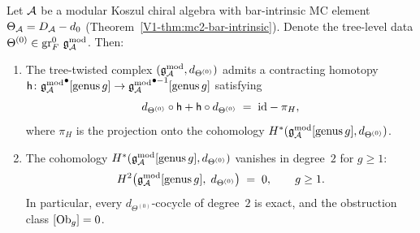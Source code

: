 \begin{theorem}
\label{thm:thqg-VII-contracting-homotopy}
Let $\mathcal{A}$ be a modular Koszul chiral algebra with bar-intrinsic
MC element $\Theta_{\mathcal{A}} = D_{\mathcal{A}} - d_0$
\textup{(}Theorem~\textup{\ref*{V1-thm:mc2-bar-intrinsic})}. Denote
the tree-level data $\Theta^{(0)} \in \operatorname{gr}^0_F\,\mathfrak{g}_{\mathcal{A}}^{\mathrm{mod}}$. Then:

\begin{enumerate}[label=\textup{(\roman*)}]
\item The tree-twisted complex $(\mathfrak{g}_{\mathcal{A}}^{\mathrm{mod}}, d_{\Theta^{(0)}})$
 admits a contracting homotopy
 $\mathsf{h} \colon {\mathfrak{g}_{\mathcal{A}}^{\mathrm{mod}}}^{\bullet}[\mathrm{genus\,}g]
 \to {\mathfrak{g}_{\mathcal{A}}^{\mathrm{mod}}}^{\bullet - 1}[\mathrm{genus\,}g]$
 satisfying
 \begin{equation}%
 d_{\Theta^{(0)}} \circ \hCont
 + \hCont \circ d_{\Theta^{(0)}}
 \;=\; \id - \pi_H,
 \end{equation}
 where $\pi_H$ is the projection onto the cohomology
 $H^*(\mathfrak{g}_{\mathcal{A}}^{\mathrm{mod}}[\mathrm{genus\,}g], d_{\Theta^{(0)}})$.

\item The cohomology $H^*(\mathfrak{g}_{\mathcal{A}}^{\mathrm{mod}}[\mathrm{genus\,}g],
 d_{\Theta^{(0)}})$ vanishes in degree~$2$ for $g \geq 1$:
 \begin{equation}%
 H^2\bigl(\gAmod[\mathrm{genus\,}g],\; d_{\Theta^{(0)}}\bigr)
 \;=\; 0, \qquad g \geq 1.
 \end{equation}
 In particular, every $d_{\Theta^{(0)}}$-cocycle of
 degree~$2$ is exact, and the obstruction class $[\mathrm{Ob}_g] = 0$.
\end{enumerate}
\end{theorem}

